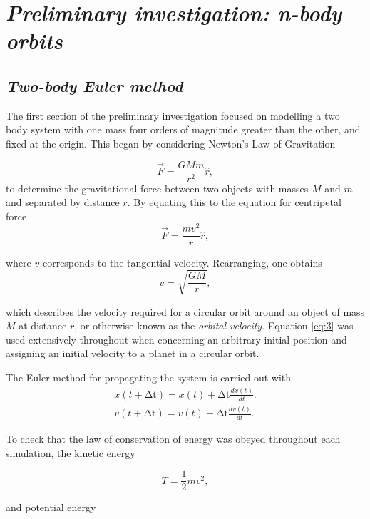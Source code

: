 \documentclass[11pt, english]{report}
\begin{document}
\section{\textsl{Preliminary investigation: n-body orbits}}
\subsection{\textsl{Two-body Euler method}}

\normalsize{\noindent 
The first section of the preliminary investigation focused on modelling a two body system with one mass four orders of magnitude greater than the other, and fixed at the origin. This began by considering Newton's Law of Gravitation \cite{newton_principia_1999}

\begin{equation} \label{eq:1}
    \vec{F} = \frac{GMm}{r^2} \hat{r},
\end{equation}
to determine the gravitational force between two objects with masses $M$ and $m$ and separated by distance $r$. By equating this to the equation for centripetal force \cite{newton_principia_1999} \begin{equation}
    \vec{F} = \frac{mv^2}{r} \hat{r},
\end{equation}

\noindent where $v$ corresponds to the tangential velocity. Rearranging, one obtains 
\begin{equation} \label{eq:3}
    v = \sqrt{\frac{GM}{r}},
\end{equation}

\noindent which describes the velocity required for a circular orbit around an object of mass $M$ at distance $r$, or otherwise known as the \emph{orbital velocity}. Equation \ref{eq:3} was used extensively throughout when concerning an arbitrary initial position and assigning an initial velocity to a planet in a circular orbit. 

The Euler method for propagating the system \cite{bowler_phas0030_nodate} is carried out with 
\begin{align}
    x\left(t+\mathrm{\Delta t}\right)=x\left(t\right)+\mathrm{\Delta t}\frac{dx\left(t\right)}{dt}.\\
    v\left(t+\mathrm{\Delta t}\right)=v\left(t\right)+\mathrm{\Delta t}\frac{dv\left(t\right)}{dt}.
\end{align}
}

\normalsize{
\noindent To check that the law of conservation of energy \cite{noauthor_feynman_nodate} was obeyed throughout each simulation, the kinetic energy \cite{noauthor_210_2018}

\begin{equation}
    T = \frac{1}{2} m v^2,
\end{equation}
}
\noindent and potential energy \cite{noauthor_gravitational_nodate}
\end{document}
